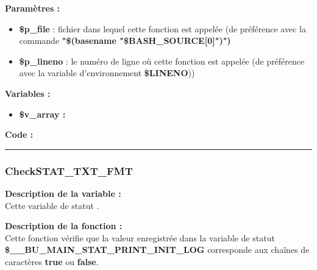 \documentclass[a4paper,10pt]{article}
\begin{document}
\begin{justify}
    \textbf{Paramètres :}

    \begin{itemize}
        \item \color{orange}\textbf{\$p\_file}\color{white} : fichier dans lequel cette fonction est appelée (de préférence avec la commande \textbf{"\$(\color{gray}basename \color{white}"\color{orange}\$BASH\_SOURCE[0]\color{white}")")}\\

        \item \color{orange}\textbf{\$p\_lineno}\color{white} : le numéro de ligne où cette fonction est appelée (de préférence avec la variable d'environnement \textbf{\color{orange}\$LINENO}))
    \end{itemize}
\end{justify}

\begin{justify}
    \textbf{Variables :}

    \begin{itemize}
        \item \textbf{\color{orange}\$v\_array\color{white} :}
    \end{itemize}
\end{justify}

\begin{justify}
    \textbf{Code :}
\end{justify}



\color{blue}\par\noindent\rule{\textwidth}{0.4pt}\color{white}

\color{blue}
\subsubsection{CheckSTAT\_TXT\_FMT}\color{white}

\begin{justify}
    \textbf{Description de la variable :}\\
    Cette variable de statut .
\end{justify}

\begin{justify}
    \textbf{Description de la fonction :}\\
    Cette fonction vérifie que la valeur enregistrée dans la variable de statut \textbf{\color{orange}\$\_\_BU\_MAIN\_STAT\_PRINT\_INIT\_LOG} corresponde aux chaînes de caractères \textbf{true} ou \textbf{false}.
\end{justify}
\end{document}
